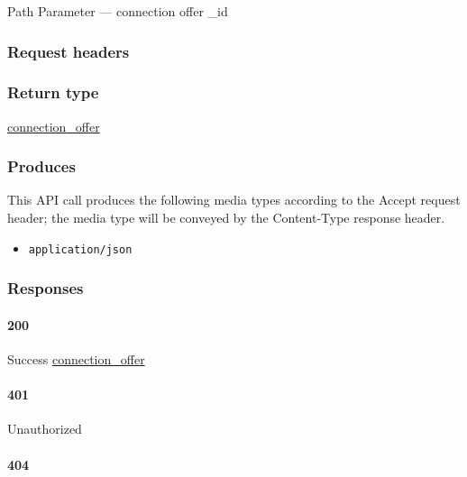 {Path Parameter} --- connection offer \_id

\hypertarget{request-headers-82}{%
\subsubsection{Request headers}\label{request-headers-82}}

\hypertarget{return-type-118}{%
\subsubsection{Return type}\label{return-type-118}}

\protect\hyperlink{connection_offer}{connection\_offer}

\hypertarget{produces-151}{%
\subsubsection{Produces}\label{produces-151}}

This API call produces the following media types according to the
{Accept} request header; the media type will be conveyed by the
{Content-Type} response header.

\begin{itemize}
\tightlist
\item
  \texttt{application/json}
\end{itemize}

\hypertarget{responses-156}{%
\subsubsection{Responses}\label{responses-156}}

\hypertarget{section-502}{%
\paragraph{200}\label{section-502}}

Success \protect\hyperlink{connection_offer}{connection\_offer}

\hypertarget{section-503}{%
\paragraph{401}\label{section-503}}

Unauthorized \protect\hyperlink{}{}

\hypertarget{section-504}{%
\paragraph{404}\label{section-504}}

